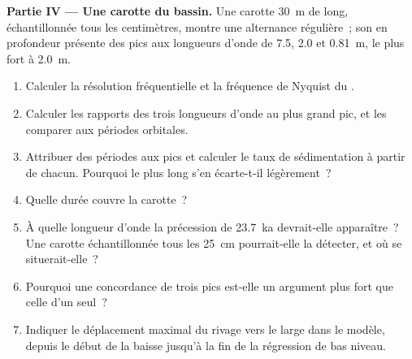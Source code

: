 \begin{problem}
\textbf{Partie IV --- Une carotte du bassin.} Une carotte
\qty{30}{m} de long, échantillonnée tous les centimètres, montre une alternance régulière~; son
 en profondeur présente des pics aux longueurs d'onde de 7.5, 2.0 et \qty{0.81}{m},
le plus fort à \qty{2.0}{m}.
\begin{enumerate}[resume]
\item Calculer la résolution fréquentielle et la fréquence de Nyquist du
  .
\item Calculer les rapports des trois longueurs d'onde au plus grand pic, et
  les comparer aux périodes orbitales.
\item Attribuer des périodes aux pics et calculer le taux de sédimentation à partir
  de chacun. Pourquoi le plus long s'en écarte-t-il légèrement~?
\item Quelle durée couvre la carotte~?
\item À quelle longueur d'onde la précession de \qty{23.7}{ka} devrait-elle apparaître~?
  Une carotte échantillonnée tous les \qty{25}{cm} pourrait-elle la détecter, et où se situerait-elle~?
\item Pourquoi une concordance de trois pics est-elle un argument plus fort que celle d'un seul~?
\item Indiquer le déplacement maximal du rivage vers le large dans le modèle, depuis
  le début de la baisse jusqu'à la fin de la régression de bas niveau.
\end{enumerate}
\end{problem}
